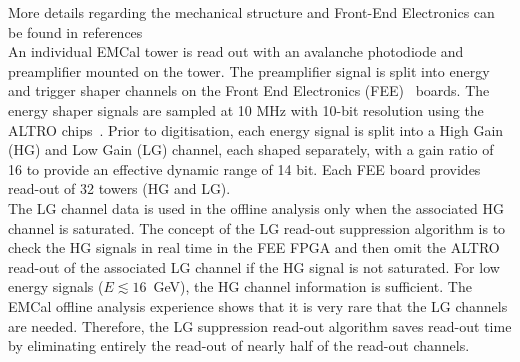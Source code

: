 More details regarding the mechanical structure and Front-End Electronics can be found in references~\cite{Cortese:2008zza, Allen:2010stl}\\
%
An individual EMCal tower is read out with an avalanche photodiode and preamplifier mounted on the tower. The preamplifier signal is split into energy and trigger shaper channels on the Front End Electronics (FEE)~\cite{Muller:2006jr} boards. The energy shaper signals are sampled at 10 MHz with 10-bit resolution using the ALTRO 
chips~\cite{EsteveBosch:2003bj}. Prior to digitisation, each energy signal is split into a High Gain (HG) and Low Gain (LG) channel, each shaped separately, with a gain ratio of 16 to provide an effective dynamic range of 14 bit. Each FEE board provides read-out of 32 towers (HG and LG).\\
%
The LG channel data is used in the offline analysis only when the associated HG channel is saturated. The concept of the LG read-out suppression algorithm is to check the HG signals in real time in the FEE FPGA and then omit the ALTRO read-out of the associated LG channel if the HG signal is not saturated. For low energy signals ($E \lesssim 16$~GeV), the HG channel information is sufficient. The EMCal offline analysis experience shows that it is very rare that the LG channels are needed. Therefore, the LG suppression read-out algorithm saves read-out time by eliminating entirely the read-out of nearly half of the read-out channels. 
%
